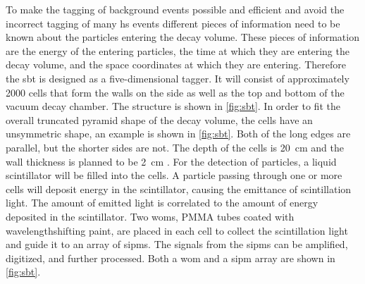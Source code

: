 To make the tagging of background events possible and efficient and avoid the incorrect tagging of many \ac{hs} events different pieces of information need to be known about the particles entering the decay volume.
These pieces of information are the energy of the entering particles, the time at which they are entering the decay volume, and the space coordinates at which they are entering.
Therefore the \ac{sbt} is designed as a five-dimensional tagger.
It will consist of approximately 2000 cells that form the walls on the side as well as the top and bottom of the vacuum decay chamber.
The structure is shown in \autoref{fig:sbt}.
In order to fit the overall truncated pyramid shape of the decay volume, the cells have an unsymmetric shape, an example is shown in \autoref{fig:sbt}.
Both of the long edges are parallel, but the shorter sides are not.
The depth of the cells is \SI{20}{\centi\meter} and the wall thickness is planned to be \SI{2}{\centi\meter} \cite{}.
For the detection of particles, a liquid scintillator will be filled into the cells.
A particle passing through one or more cells will deposit energy in the scintillator, causing the emittance of scintillation light.
The amount of emitted light is correlated to the amount of energy deposited in the scintillator.
Two \acp{wom}, PMMA tubes coated with wavelengthshifting paint, are placed in each cell to collect the scintillation light and guide it to an array of \acp{sipm}.
The signals from the \acp{sipm} can be amplified, digitized, and further processed.
Both a \ac{wom} and a \ac{sipm} array are shown in \autoref{fig:sbt}.
